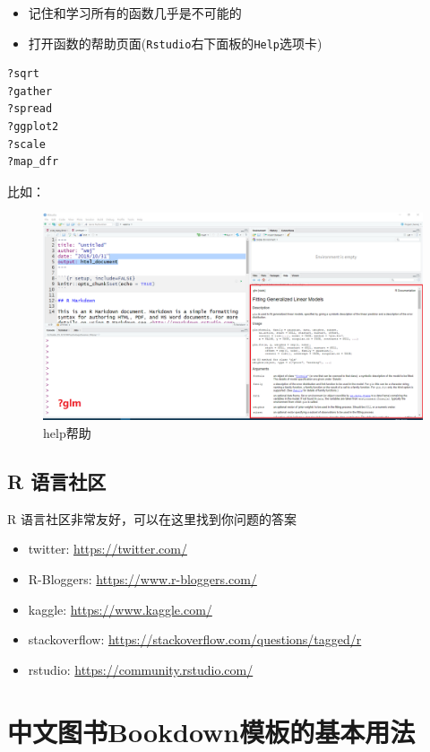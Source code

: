 \documentclass[
]{book}
\providecommand{\tightlist}{%
  \setlength{\itemsep}{0pt}\setlength{\parskip}{0pt}}
\begin{document}
\begin{itemize}
\tightlist
\item
  记住和学习所有的函数几乎是不可能的
\item
  打开函数的帮助页面(\texttt{Rstudio}右下面板的\texttt{Help}选项卡)
\end{itemize}

\begin{verbatim}
?sqrt
?gather
?spread
?ggplot2
?scale
?map_dfr
\end{verbatim}

比如：

\begin{figure}
\centering
\includegraphics{figure/20.png}
\caption{help帮助}
\end{figure}

\hypertarget{r-ux8bedux8a00ux793eux533a}{%
\section*{R 语言社区}\label{r-ux8bedux8a00ux793eux533a}}

R 语言社区非常友好，可以在这里找到你问题的答案

\begin{itemize}
\tightlist
\item
  twitter: \url{https://twitter.com/}
\item
  R-Bloggers: \url{https://www.r-bloggers.com/}
\item
  kaggle: \url{https://www.kaggle.com/}
\item
  stackoverflow: \url{https://stackoverflow.com/questions/tagged/r}
\item
  rstudio: \url{https://community.rstudio.com/}
\end{itemize}

\hypertarget{usage}{%
\chapter{中文图书Bookdown模板的基本用法}\label{usage}}
\end{document}
